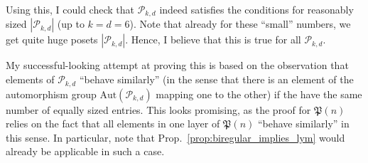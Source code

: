 \documentclass{scrartcl}
\newcommand{\powerset}{\mathfrak{P}}
\theoremstyle{definition}
\begin{document}
Using this, I could check that $\mathcal{P}_{k, d}$ indeed satisfies the conditions for reasonably sized $|\mathcal{P}_{k, d}|$ (up to $k = d = 6$).
Note that already for these ``small'' numbers, we get quite huge posets $|\mathcal{P}_{k, d}|$.
Hence, I believe that this is true for all $\mathcal{P}_{k, d}$.

My successful-looking attempt at proving this is based on the observation that elements of $\mathcal{P}_{k, d}$ ``behave similarly'' (in the sense that there is an element of the automorphism group $\mathrm{Aut}(\mathcal{P}_{k, d})$ mapping one to the other) if the have the same number of equally sized entries.
This looks promising, as the proof for $\powerset(n)$ relies on the fact that all elements in one layer of $\powerset(n)$ ``behave similarly'' in this sense.
In particular, note that Prop.~\ref{prop:biregular_implies_lym} would already be applicable in such a case.
\end{document}

